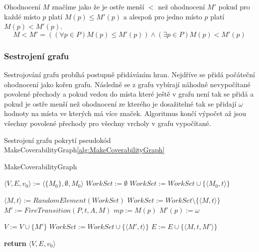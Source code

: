 \documentclass[
  biblatex,
  glossaries,
  index
]{kidiplom}
\begin{document}
Ohodnocení $M$ značíme jako že je ostře menší $<$ než ohodnocení $M'$
pokud pro každé místo $p$ platí $M(p) \leq M'(p)$ a alespoň pro jedno
místo $p$ platí $M(p) < M'(p)$.
$$
 M<M' = ((\forall p \in P) M(p) \leq M'(p)) \land (\exists p \in P) M(p) < M'(p)
$$

\subsubsection{Sestrojení grafu}

Sestrojování grafu probíhá postupně přidáváním hran. Nejdříve se přidá počáteční 
ohodnocení jako kořen grafu. Následně se z grafu vybírají náhodně
nevypočítané povolené přechody a pokud vedou do místa které ještě 
v grafu není tak se přidá a pokud je ostře menší než ohodnocení ze kterého
je dosažitelné tak se přidají $\omega$ hodnoty na místa ve kterých má více značek.
Algoritmus končí výpočet až jsou všechny povolené 
přechody pro všechny vrcholy v grafu vypočítané.

\begin{center}
  Sestrojení grafu pokrytí pseudokód MakeCoverabilityGraph\ref{alg:MakeCoverabilityGraph}
\end{center}

\begin{algorithm}
  \caption{MakeCoverabilityGraph}\label{alg:MakeCoverabilityGraph}
  \begin{algorithmic}[1]
    \State $\langle V,E,v_0\rangle := \langle\{M_0\},\emptyset,M_0\rangle$
    \State $WorkSet := \emptyset $
    \State $WorkSet := WorkSet \cup \{\langle M_0, t \rangle\} $
    \EndFor

    \State $\langle M, t \rangle := RandomElement(WorkSet)$
    \State $WorkSet := WorkSet \setminus \{\langle M, t \rangle\}$
    \State $M' := FireTransition(P,t,A,M)$
    \State $mp := M(p)$
    \State $M'(p) := \omega$
    \EndIf
    \EndFor
    \EndFor

    \State $V := V \cup \{M'\}$
    \State $WorkSet := WorkSet \cup \{\langle M', t \rangle\} $
    \EndFor
    \EndIf
    \State $E := E \cup \{\langle M,t,M'\rangle\}$
    \EndWhile

    \State \textbf{return} $\langle V,E,v_0\rangle$
    \EndFunction
  \end{algorithmic}
\end{algorithm}
\end{document}
